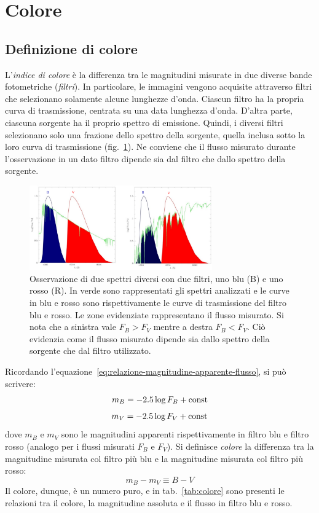 \section{Colore}\label{sec:colore}
\subsection{Definizione di colore}
L'\emph{indice di colore} è la differenza tra le magnitudini misurate in due diverse bande fotometriche (\emph{filtri}). In particolare, le immagini vengono acquisite attraverso filtri che selezionano solamente alcune lunghezze d'onda. Ciascun filtro ha la propria curva di trasmissione, centrata su una data lunghezza d'onda. D'altra parte, ciascuna sorgente ha il proprio spettro di emissione. Quindi, i diversi filtri selezionano solo una frazione dello spettro della sorgente, quella inclusa sotto la loro curva di trasmissione (fig.~\ref{fig:filtri-fotometrici}). Ne conviene che il flusso misurato durante l'osservazione in un dato filtro dipende sia dal filtro che dallo spettro della sorgente.

\begin{figure}
\centering
\includegraphics[width=0.7\textwidth]{immagini/filtri-fotometrici.png}
\caption{Osservazione di due spettri diversi con due filtri, uno blu (B) e uno rosso (R). In verde sono rappresentati gli spettri analizzati e le curve in blu e rosso sono rispettivamente le curve di trasmissione del filtro blu e rosso. Le zone evidenziate rappresentano il flusso misurato. Si nota che a sinistra vale $F_B > F_V$ mentre a destra $F_B < F_V$. Ciò evidenzia come il flusso misurato dipende sia dallo spettro della sorgente che dal filtro utilizzato.}
\label{fig:filtri-fotometrici}
\end{figure}

Ricordando l'equazione~\eqref{eq:relazione-magnitudine-apparente-flusso}, si può scrivere:
\[
    m_B = -2.5 \log F_B + \textup{const}
\]
\[
    m_V = -2.5 \log F_V + \textup{const}
\]
dove $m_B$ e $m_V$ sono le magnitudini apparenti rispettivamente in filtro blu e filtro rosso (analogo per i flussi misurati $F_B$ e $F_V$). Si definisce \emph{colore} la differenza tra la magnitudine misurata col filtro più blu e la magnitudine misurata col filtro più rosso:
\begin{equation}\label{eq:colore}
    m_B - m_V \equiv B-V
\end{equation}
Il colore, dunque, è un numero puro, e in tab.~\ref{tab:colore} sono presenti le relazioni tra il colore, la magnitudine assoluta e il flusso in filtro blu e rosso. 

